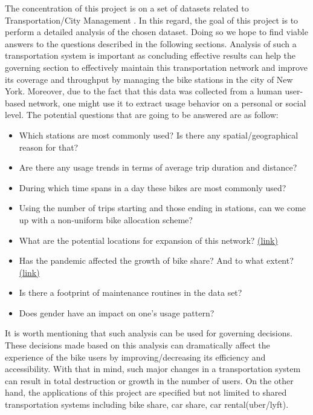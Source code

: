 \documentclass[sigconf,authordraft]{acmart}
\begin{document}
The concentration of this project is on a set of datasets related to Transportation/City Management  \cite{last.fm} . In this regard, the goal of this project is to perform a detailed analysis of the chosen dataset. Doing so we hope to find viable answers to the questions described in the following sections. Analysis of such a transportation system is important as concluding effective results can help the governing section to effectively maintain this transportation network and improve its coverage and throughput by managing the bike stations in the city of New York. Moreover, due to the fact that this data was collected from a human user-based network, one might use it to extract usage behavior on a personal or social level. The potential questions that are going to be answered are as follow:
\begin{itemize}
    \item Which stations are most commonly used? Is there any spatial/geographical reason for that?
    \item  Are there any usage trends in terms of average trip duration and distance?
    \item During which time spans in a day these bikes are most commonly used?
    \item  Using the number of trips starting and those ending in stations, can we come up with a non-uniform bike allocation scheme?
    \item What are the potential locations for expansion of this network? \href{https://ride.citibikenyc.com/blog/major-citi-bike-expansion-map-revealed}{\color{blue} (link)}
     \item Has the pandemic affected the growth of bike share? And to what extent?\href{https://www.nytimes.com/2021/12/02/nyregion/citi-bike-parking-docking-station.html}{\color{blue} (link)}
     \item Is there a footprint of maintenance routines in the data set?
     \item Does gender have an impact on one's usage pattern?

\end{itemize}

It is worth mentioning that such analysis can be used for governing decisions. These decisions made based on this analysis can dramatically affect the experience of the bike users by improving/decreasing its efficiency and accessibility. With that in mind, such major changes in a transportation system can result in total destruction or growth in the number of users. On the other hand, the applications of this project are specified but not limited to shared transportation systems including bike share, car share, car rental(uber/lyft).
\end{document}
